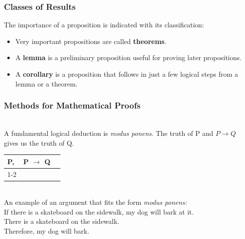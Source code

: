 \documentclass[aspectratio=169, handout]{beamer}
\numberwithin{equation}{section}
\begin{document}
\begin{frame}
\frametitle{Classes of Results}

The importance of a proposition is indicated with its classification: \pause

\begin{itemize}
\item Very important propositions are called \textbf{theorems}. \pause
\item A \textbf{lemma} is a preliminary proposition useful for proving later propositions. \pause
\item A \textbf{corollary} is a proposition that follows in just a few logical steps from a lemma or a theorem.
\end{itemize}

\end{frame}



\begin{frame}
\frametitle{Methods for Mathematical Proofs}

\ \\A fundamental logical deduction is \emph{modus ponens}.  The truth of P and $P \rightarrow Q$ gives us the truth of Q. \pause

\begin{table}[]
\begin{tabular}{ccl}
\multicolumn{1}{l}{P,} & \multicolumn{1}{l}{P $\rightarrow$ Q} &  \\ \cline{1-2}
\multicolumn{2}{c}{Q}                                    &  \\
\end{tabular}
\end{table} \pause

\ \\An example of an argument that fits the form \emph{modus ponens:} \pause
\ \\If there is a skateboard on the sidewalk, my dog will bark at it.
\ \\There is a skateboard on the sidewalk.\pause
\ \\Therefore, my dog will bark.

\end{frame}
\end{document}
